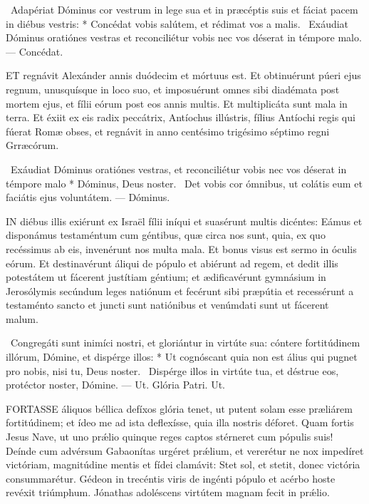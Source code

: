 \R\ Adapériat Dóminus cor vestrum in lege sua et in præcéptis suis et fáciat pacem in diébus vestris: * Concédat vobis salútem, et rédimat vos a malis. \V\ Exáudiat Dóminus oratiónes vestras et reconciliétur vobis nec vos déserat in témpore malo. — Concédat.


\lettrine[lines=2]{E}{T} regnávit Alexánder annis duódecim et mórtuus est. Et obtinuérunt púeri ejus regnum, unusquísque in loco suo, et imposuérunt omnes sibi diadémata post mortem ejus, et fílii eórum post eos annis multis. Et multiplicáta sunt mala in terra. Et éxiit ex eis radix peccátrix, Antíochus illústris, fílius Antíochi regis qui fúerat Romæ obses, et regnávit in anno centésimo trigésimo séptimo regni Grræcórum.

\R\ Exáudiat Dóminus oratiónes vestras, et reconciliétur vobis nec vos déserat in témpore malo * Dóminus, Deus noster. \V\ Det vobis cor ómnibus, ut colátis eum et faciátis ejus voluntátem. — Dóminus.


\lettrine[lines=2]{I}{N} diébus illis exiérunt ex Israël fílii iníqui et suasérunt multis dicéntes: Eámus et disponámus testaméntum cum géntibus, quæ circa nos sunt, quia, ex quo recéssimus ab eis, invenérunt nos multa mala. Et bonus visus est sermo in óculis eórum. Et destinavérunt áliqui de pópulo et abiérunt ad regem, et dedit illis potestátem ut fácerent justítiam géntium; et ædificavérunt gymnásium in Jerosólymis secúndum leges natiónum et fecérunt sibi præpútia et recessérunt a testaménto sancto et juncti sunt natiónibus et venúmdati sunt ut fácerent malum.

\R\ Congregáti sunt inimíci nostri, et gloriántur in virtúte sua: cóntere fortitúdinem illórum, Dómine, et dispérge illos: * Ut cognóscant quia non est álius qui pugnet pro nobis, nisi tu, Deus noster. \V\ Dispérge illos in virtúte tua, et déstrue eos, protéctor noster, Dómine. — Ut. Glória Patri. Ut.




\lettrine[lines=2]{F}{ORTASSE} áliquos béllica defíxos glória tenet, ut putent solam esse præliárem fortitúdinem; et ídeo me ad ista deflexísse, quia illa nostris déforet. Quam fortis Jesus Nave, ut uno prǽlio quinque reges captos stérneret cum pópulis suis! Deínde cum advérsum Gabaonítas urgéret prǽlium, et vererétur ne nox impedíret victóriam, magnitúdine mentis et fídei clamávit: Stet sol, et stetit, donec victória consummarétur. Gédeon in trecéntis viris de ingénti pópulo et acérbo hoste revéxit triúmphum. Jónathas adoléscens virtútem magnam fecit in prǽlio.

